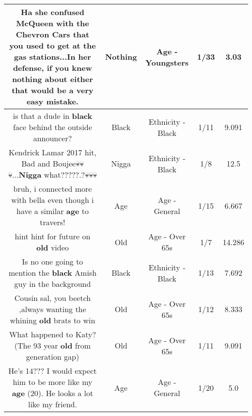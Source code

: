 \documentclass[11pt]{article}
\newlength\mylength
\begin{document}
\begin{center}
\begin{longtable}{|C{.65\mylength}|C{.30\mylength}|C{.12\mylength}|C{.12\mylength}|C{.12\mylength}|}
  \small Ha she confused McQueen with the Chevron Cars that you used to get at the gas stations...In her defense, if you knew \textbf{nothing} about either that would be a very easy mistake.\normalsize   & Nothing & Age - Youngsters & 1/33 & 3.03 \\  \hline
  \small is that a dude in \textbf{black} face behind the outside announcer?\normalsize   & Black & Ethnicity - Black & 1/11 & 9.091 \\  \hline
  \small Kendrick Lamar 2017 hit, Bad and Boujee💀💀💀...\textbf{Nigga} what?????.?💀💀💀\normalsize   & Nigga & Ethnicity - Black & 1/8 & 12.5 \\  \hline
  \small bruh, i connected more with bella even though i have a similar \textbf{age} to travers!\normalsize   & Age & Age - General & 1/15 & 6.667 \\  \hline
  \small hint hint for future on \textbf{old} video\normalsize   & Old & Age - Over 65s & 1/7 & 14.286 \\  \hline
  \small Is no one going to mention the \textbf{black} Amish guy in the background\normalsize   & Black & Ethnicity - Black & 1/13 & 7.692 \\  \hline
  \small Cousin sal, you beetch ,always wanting the whining \textbf{old} brats to win\normalsize   & Old & Age - Over 65s & 1/12 & 8.333 \\  \hline
  \small What happened to Katy? (The 93 year \textbf{old} from generation gap)\normalsize   & Old & Age - Over 65s & 1/11 & 9.091 \\  \hline
  \small He's 14??? I would expect him to be more like my \textbf{age} (20).  He looks a lot like my friend.\normalsize   & Age & Age - General & 1/20 & 5.0 \\  \hline

\end{longtable}
\end{center}
\end{document}
